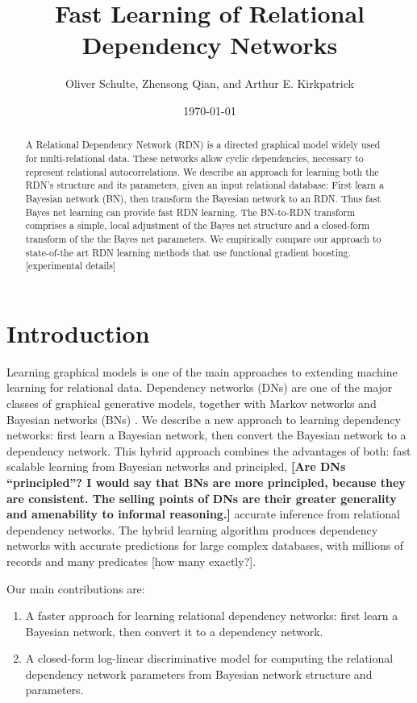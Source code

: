 \documentclass[runningheads,a4paper]{llncs}
\title{Fast Learning of Relational Dependency Networks}
\author{ Oliver Schulte, Zhensong Qian, and  Arthur E. Kirkpatrick
 }
\institute{ School of Computing Science\\ Simon Fraser University\\Burnaby and Surrey, BC, Canada\\
\{oschulte,zqian,ted\}@sfu.ca\\
\url{http://www.cs.sfu.ca/~oschulte/}}
\date{\today}
\newcommand{\fixneeded}[1]{\textbf{[\footnotesize #1]}}
\begin{document}
\maketitle



\begin{abstract} 
A Relational Dependency Network (RDN) is a directed graphical model widely used for multi-relational data. These networks allow cyclic dependencies, necessary to represent relational autocorrelations. We describe an approach for learning both the RDN's structure and its parameters, given an input relational database: First learn a Bayesian network (BN), then transform the Bayesian network to an RDN. Thus fast Bayes net learning can provide fast RDN learning. The BN-to-RDN transform comprises a simple, local adjustment of the Bayes net structure and a closed-form transform of the the Bayes net parameters. We empirically compare our approach to state-of-the art RDN learning methods that use functional gradient boosting. [experimental details]\end{abstract}


\section{Introduction} \label{sec:intro} Learning graphical models is one of the main approaches to extending machine learning for relational data. 
Dependency networks (DNs) \cite{Heckerman2000} are one of the major classes of graphical generative models, together with Markov networks and Bayesian networks (BNs) \cite{Pearl1988}. We describe a new approach to learning dependency networks: first learn a Bayesian network, then convert the Bayesian network to a dependency network. This hybrid approach combines the advantages of both: fast scalable learning from Bayesian networks and principled, \fixneeded{Are DNs ``principled''?  I would say that BNs are more principled, because they are consistent. The selling points of DNs are their greater generality and amenability to informal reasoning.} accurate inference from relational dependency networks. The hybrid learning algorithm produces dependency networks with accurate predictions for large complex databases, with millions of records and many predicates [how many exactly?]. 

Our main contributions are:
\begin{enumerate}
\item A faster approach for learning relational dependency networks: first learn a Bayesian network, then convert it to a dependency network.
\item A closed-form log-linear discriminative model for computing the relational dependency network parameters from Bayesian network structure and parameters.
\end{enumerate}
  
\end{document}
